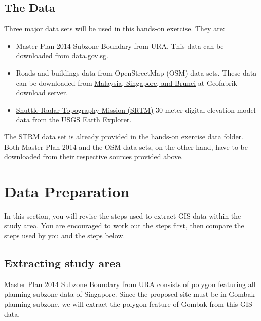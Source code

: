 \documentclass[
  letterpaper,
  DIV=11,
  numbers=noendperiod]{scrreprt}
\providecommand{\tightlist}{%
  \setlength{\itemsep}{0pt}\setlength{\parskip}{0pt}}\usepackage{longtable,booktabs,array}
\begin{document}
\hypertarget{the-data-1}{%
\subsection{The Data}\label{the-data-1}}

Three major data sets will be used in this hands-on exercise. They are:

\begin{itemize}
\tightlist
\item
  Master Plan 2014 Subzone Boundary from URA. This data can be
  downloaded from data.gov.sg.
\item
  Roads and buildings data from OpenStreetMap (OSM) data sets. These
  data can be downloaded from
  \href{https://download.geofabrik.de/asia/malaysia-singapore-brunei.html}{Malaysia,
  Singapore, and Brunei} at Geofabrik download server.
\item
  \href{https://gisgeography.com/srtm-shuttle-radar-topography-mission/}{Shuttle
  Radar Topography Mission (SRTM)} 30-meter digital elevation model data
  from the \href{https://earthexplorer.usgs.gov/}{USGS Earth Explorer}.
\end{itemize}

The STRM data set is already provided in the hands-on exercise data
folder. Both Master Plan 2014 and the OSM data sets, on the other hand,
have to be downloaded from their respective sources provided above.

\hypertarget{data-preparation-4}{%
\section{Data Preparation}\label{data-preparation-4}}

In this section, you will revise the steps used to extract GIS data
within the study area. You are encouraged to work out the steps first,
then compare the steps used by you and the steps below.

\hypertarget{extracting-study-area}{%
\subsection{Extracting study area}\label{extracting-study-area}}

Master Plan 2014 Subzone Boundary from URA consists of polygon featuring
all planning subzone data of Singapore. Since the proposed site must be
in Gombak planning subzone, we will extract the polygon feature of
Gombak from this GIS data.
\end{document}
